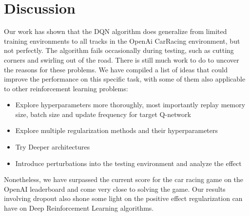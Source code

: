 \chapter{Discussion}\label{Ch:FutureWork}

Our work has shown that the DQN algorithm does generalize from limited training environments to all tracks in the OpenAi CarRacing environment, but not perfectly. The algorithm fails occasionally during testing, such as cutting corners and swirling out of the road. There is still much work to do to uncover the reasons for these problems. We have compiled a list of ideas that could  improve the performance on this specific task, with some of them also applicable to other reinforcement learning problems:
\begin{itemize}
\item Explore hyperparameters more thoroughly, most importantly  replay memory size, batch size and update frequency for target Q-network
\item Explore multiple regularization methods and their hyperparameters
\item Try Deeper architectures
\item Introduce perturbations into the testing environment and analyze the effect
\end{itemize}

Nonetheless, we have surpassed the current score for the car racing game on the OpenAI leaderboard and come very close to solving the game. Our results involving dropout also shone some light on the positive effect regularization can have on Deep Reinforcement Learning algorithms.

\endinput

